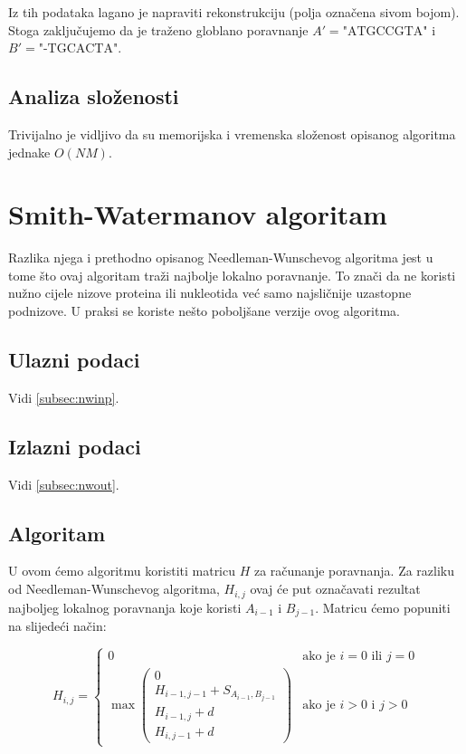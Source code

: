\documentclass[times, utf8, zavrsni]{fer}
\begin{document}
Iz tih podataka lagano je napraviti rekonstrukciju (polja označena sivom
bojom). Stoga zaključujemo da je traženo globlano poravnanje
$A' = \mbox{"ATGCCGTA"}$ i $B' = \mbox{"-TGCACTA"}$.

\subsection{Analiza složenosti}
Trivijalno je vidljivo da su memorijska i vremenska složenost opisanog algoritma 
jednake $O(NM)$. 

\section{Smith-Watermanov algoritam}
\label{sec:swalg}
Razlika njega i prethodno opisanog Needleman-Wunschevog algoritma jest u tome
što ovaj algoritam traži najbolje lokalno poravnanje. To znači da ne koristi
nužno cijele nizove proteina ili nukleotida već samo najsličnije uzastopne
podnizove. U praksi se koriste nešto poboljšane verzije ovog algoritma.

\subsection{Ulazni podaci}
Vidi \autoref{subsec:nwinp}.

\subsection{Izlazni podaci}
Vidi \autoref{subsec:nwout}.

\subsection{Algoritam}
\label{subsec:swalg}
U ovom ćemo algoritmu koristiti matricu $H$ za računanje poravnanja.
Za razliku od Needleman-Wunschevog algoritma, $H_{i,j}$ ovaj će put
označavati rezultat
najboljeg lokalnog poravnanja koje koristi $A_{i-1}$ i $B_{j-1}$.
Matricu ćemo popuniti na slijedeći način:

$$
H_{i,j} =
\left\{ \begin{array}{ll}
	0 & \mbox{ako je } i=0 \mbox{ ili } j=0 \\
	\max \left( \begin{array}{l}
		0 \\
		H_{i-1,j-1} + S_{A_{i-1}, B_{j-1}} \\
		H_{i-1, j} + d \\
		H_{i, j-1} + d
	\end{array} \right) & \mbox{ako je } i>0 \mbox{ i } j>0
\end{array} \right.
$$
\end{document}

